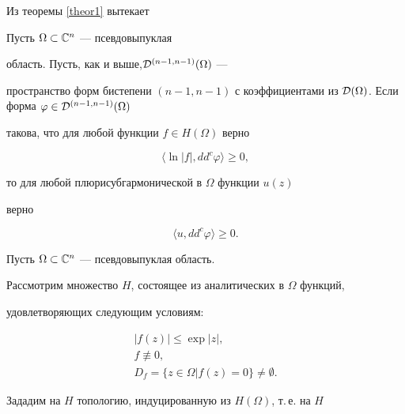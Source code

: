 Из теоремы \ref{theor1} вытекает





\begin{cor}


Пусть $\Omega\subset \Bbb C^n$ --- псевдовыпуклая 


область. Пусть, как и выше,\linebreak ${\cal D}^{(n-1,n-1)}(\Omega)$ --- 


пространство форм бистепени $(n-1,n-1)$ с коэффициентами из ${\cal 


D}(\Omega)$. Если форма $\varphi\in {\cal D}^{(n-1,n-1)}(\Omega)$


такова, что для любой функции $f\in H(\Omega)$ верно


$$


\langle\ln|f|,dd^c\varphi\rangle\ge 0,


$$


то для любой плюрисубгармонической в $\Omega$ функции $u(z)$ 


верно


$$


\langle u,dd^c\varphi\rangle\ge 0.


$$


\end{cor}





Пусть $\Omega\subset\Bbb C^n$ --- псевдовыпуклая область. 


Рассмотрим множество $H$, состоящее из аналитических в $\Omega$ функций, 


удовлетворяющих следующим условиям:


\begin{gather}\label{form10}


|f(z)|\le \exp |z|, \\


%


\label{form11}


f\not\equiv 0, \\


%


\label{form12}


D_f=\{z\in\Omega| f(z)=0\}\not=\emptyset.


\end{gather}





Зададим на $H$ топологию, индуцированную из $H(\Omega)$, т.\,е. на $H$ 


